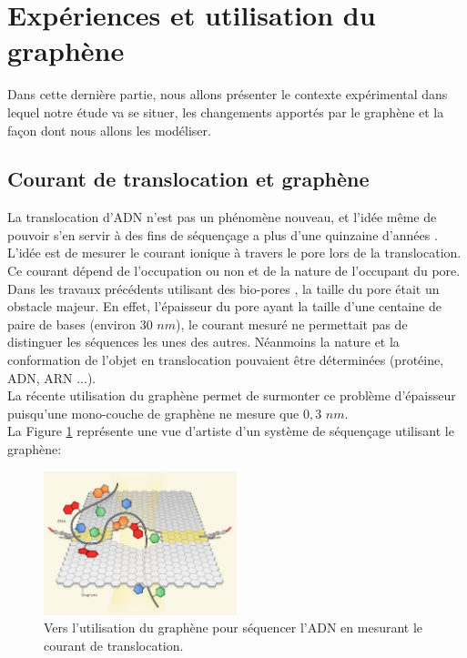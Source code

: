 \documentclass[a4paper,11pt]{article}
\begin{document}
\section{Expériences et utilisation du graphène}

Dans cette dernière partie, nous allons présenter le contexte expérimental dans lequel notre étude va se situer, les changements apportés par le graphène et la façon dont nous allons les modéliser.

\subsection{Courant de translocation et graphène}

La translocation d'ADN n'est pas un phénomène nouveau, et l'idée même de pouvoir s'en servir à des fins de séquençage a plus d'une quinzaine d'années \cite{holesedge}. L'idée est de mesurer le courant ionique à travers le pore lors de la translocation. Ce courant dépend de l'occupation ou non et de la nature de l'occupant du pore.\\

Dans les travaux précédents utilisant des bio-pores \cite{graph}, la taille du pore était un obstacle majeur. En effet, l'épaisseur du pore ayant la taille d'une centaine de paire de bases (environ $30$ $ nm$), le courant mesuré ne permettait pas de distinguer les séquences les unes des autres. Néanmoins la nature et la conformation de l'objet en translocation pouvaient être déterminées (protéine, ADN, ARN ...).\\

La récente utilisation du graphène permet de surmonter ce problème d'épaisseur puisqu'une mono-couche de graphène ne mesure que $0,3$ $ nm$.\\

La Figure \ref{courant} représente une vue d'artiste d'un système de séquençage utilisant le graphène:

\begin{figure}[H]
\begin{center}
\includegraphics[width=0.5\textwidth]{courant.jpg}

\caption{Vers l'utilisation du graphène pour séquencer l'ADN en mesurant le courant de translocation.}
\label{courant}
\end{center}
\end{figure}
\end{document}
